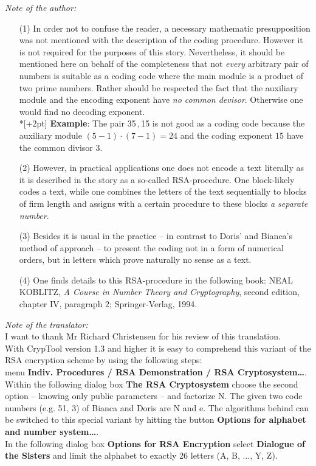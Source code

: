 \noindent
{\em Note of the author:\/}
\begin{itemize}
\item[(1)] In order not to confuse the reader, a necessary mathematic
  presupposition was not mentioned with the description of the coding
  procedure.  However it is not required for the purposes of this story.
  Nevertheless, it should be mentioned here on behalf of the completeness
  that not {\em every\/} arbitrary pair of numbers is suitable as a coding
  code where the main module is a product of two prime numbers.  Rather
  should be respected the fact that the auxiliary module and the encoding
  exponent have {\em no common devisor\/}.
  Otherwise one would find no decoding exponent. \\*[+2pt]
  {\bf Example}: The pair 35\,,\,15 is not good as a coding code
  because the auxiliary module \((5-1) \cdot (7-1) =24\) and the coding
  exponent \(15\) have the common divisor \(3\).
\item[(2)] However, in practical applications one does not encode a text literally
as it is described in the story as a so-called RSA-procedure.  One
block-likely codes a text, while one combines the letters of the text
sequentially to blocks of firm length and assigns with a certain procedure
to these blocks {\em a separate number\/}.

\item[(3)] Besides it is usual in the practice -- in contrast to Doris' and
Bianca's method of approach -- to present the coding not in a form of
numerical orders, but in letters which prove naturally no sense as a text.

\item[(4)] One finds details to this RSA-procedure in the following book: {\small
  NEAL KOBLITZ}, {\em A Course in Number Theory and Cryptography\/},
second edition, chapter IV, paragraph 2; Springer-Verlag, 1994. \\
\end{itemize}
\[\]
\hrulefill
\[\]
\[\]
{\em Note of the translator:} \\
I want to thank Mr Richard Christensen for his review of this translation.
\\[1ex]
With CrypTool version 1.3 and higher it is easy to comprehend this variant of the RSA encryption scheme by using 
the following steps: \\
menu {\bf Indiv. Procedures / RSA Demonstration / RSA Cryptosystem\dots}. \\
Within the following dialog box {\bf The RSA Cryptosystem} choose the second option -- knowing only public parameters -- and factorize N. The given 
two code numbers (e.g. 51, 3) of Bianca and Doris are N and e. The algorithms behind can be switched to this 
special variant by hitting the button \textbf{Options for alphabet and number system\dots}. \\
In the following dialog 
box {\bf Options for RSA Encryption} select \textbf{Dialogue of the Sisters} and limit the alphabet to exactly 26 
letters (A, B, ..., Y, Z).




